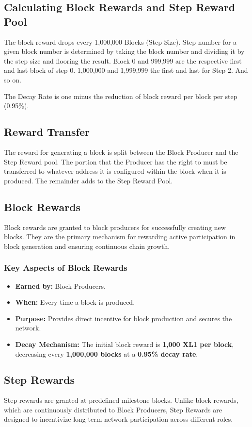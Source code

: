 \documentclass{article}
\begin{document}
\subsection{Calculating Block Rewards and Step Reward Pool}
The block reward drops every 1,000,000 Blocks (Step Size). Step number for a
given block number is determined by taking the block number and dividing it by
the step size and flooring the result. Block 0 and 999,999 are the respective
first and last block of step 0. 1,000,000 and 1,999,999 the first and last for
Step 2. And so on.

The Decay Rate is one minus the reduction of block reward per block per step
(0.95\%).

\subsection{Reward Transfer}
The reward for generating a block is split between the Block Producer and the
Step Reward pool. The portion that the Producer has the right to must be
transferred to whatever address it is configured within the block when it is
produced. The remainder adds to the Step Reward Pool.

\subsection{Block Rewards}
Block rewards are granted to block producers for successfully creating new
blocks. They are the primary mechanism for rewarding active participation in
block generation and ensuring continuous chain growth.

\subsubsection{Key Aspects of Block Rewards}
\begin{itemize}
    \item \textbf{Earned by:} Block Producers.
    \item \textbf{When:} Every time a block is produced.
    \item \textbf{Purpose:} Provides direct incentive for block production and secures the network.
    \item \textbf{Decay Mechanism:} The initial block reward is \textbf{1,000 XL1 per block}, decreasing every \textbf{1,000,000 blocks} at a \textbf{0.95\% decay rate}.
\end{itemize}

\subsection{Step Rewards}
Step rewards are granted at predefined milestone blocks. Unlike block rewards,
which are continuously distributed to Block Producers, Step Rewards are
designed to incentivize long-term network participation across different roles.
\end{document}
